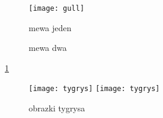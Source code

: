 \documentclass{article}
\begin{document}
\newpage


\begin{figure}[h!]
  \centering
    \texttt{[image: gull]}
	\caption{mewa jeden}
\end{figure}

\begin{figure}[h!]
  \centering
  \caption{mewa dwa}
\end{figure}


\ref{manyTigers}
\begin{figure}[here]
\vspace{0pt}
\begin{center}

\texttt{[image: tygrys]}
\texttt{[image: tygrys]}
\caption{obrazki tygrysa}
\label{manyTigers}
\end{center}

\end{figure}
\end{document}
